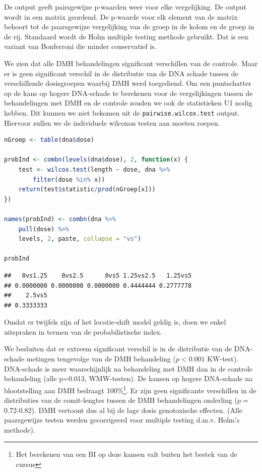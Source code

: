 \documentclass[
  12pt,dutch,coursenotes]{book}
\newcommand{\passthrough}[1]{#1}
\begin{document}
De output geeft pairsgewijze p-waarden weer voor elke vergelijking. De output wordt in een matrix geordend.
De p-waarde voor elk element van de matrix behoort tot de paarsgewijze vergelijking van de groep in de kolom en de groep in de rij.
Standaard wordt de Holm multiple testing methode gebruikt. Dat is een variant van Bonferroni die minder conservatief is.

We zien dat alle DMH behandelingen significant verschillen van de controle.
Maar er is geen significant verschil in de distributie van de DNA schade tussen de verschillende dosisgroepen waarbij DMH werd toegediend.
Om een puntschatter op de kans op hogere DNA-schade te berekenen voor de vergelijkingen tussen de behandelingen met DMH en de controle zouden we ook de statistieken U1 nodig hebben.
Dit kunnen we niet bekomen uit de \passthrough{\lstinline!pairwise.wilcox.test!} output.
Hiervoor zullen we de individuele wilcoxon testen aan moeten roepen.

\begin{lstlisting}[language=R]
nGroep <- table(dna$dose)

probInd <- combn(levels(dna$dose), 2, function(x) {
    test <- wilcox.test(length ~ dose, dna %>%
        filter(dose %in% x))
    return(test$statistic/prod(nGroep[x]))
})

names(probInd) <- combn(dna %>%
    pull(dose) %>%
    levels, 2, paste, collapse = "vs")

probInd
\end{lstlisting}

\begin{lstlisting}
##   0vs1.25    0vs2.5      0vs5 1.25vs2.5   1.25vs5 
## 0.0000000 0.0000000 0.0000000 0.4444444 0.2777778 
##    2.5vs5 
## 0.3333333
\end{lstlisting}

Omdat er twijfels zijn of het locatie-shift model geldig is, doen we enkel uitspraken in termen van de probabilistische index.

We besluiten dat er extreem significant verschil is in de distributie van de DNA-schade metingen tengevolge van de DMH behandeling (\(p<0.001\) KW-test).
DNA-schade is meer waarschijnlijk na behandeling met DMH dan in de controle behandeling (alle p=0.013, WMW-testen).
De kansen op hogere DNA-schade na blootstelling aan DMH bedraagt 100\%\footnote{Het berekenen van een BI op deze kansen valt buiten het bestek van de cursus}.
Er zijn geen significante verschillen in de distributies van de comit-lengtes tussen de DMH behandelingen onderling (\(p=\) 0.72-0.82). DMH vertoont dus al bij de lage dosis genotoxische effecten. (Alle paarsgewijze testen werden gecorrigeerd voor multiple testing d.m.v. Holm's methode).
\end{document}
